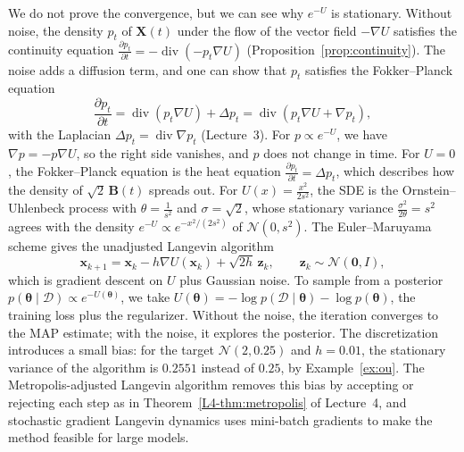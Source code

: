 \documentclass[11pt]{article}
\theoremstyle{definition}
\theoremstyle{plain}
\theoremstyle{remark}
\DeclareMathOperator{\Div}{div}
\begin{document}
We do not prove the convergence, but we can see why $e^{-U}$ is stationary. Without noise, the density $p_t$ of $\mathbf{X}(t)$ under the flow of the vector field $-\nabla U$ satisfies the continuity equation $\frac{\partial p_t}{\partial t} = -\Div(-p_t\nabla U)$ (Proposition~\ref{prop:continuity}). The noise adds a diffusion term, and one can show that $p_t$ satisfies the Fokker--Planck equation
\[\frac{\partial p_t}{\partial t} = \Div(p_t\nabla U) + \Delta p_t = \Div(p_t\nabla U + \nabla p_t),\]
with the Laplacian $\Delta p_t = \Div\nabla p_t$ (Lecture~3). For $p \propto e^{-U}$, we have $\nabla p = -p\nabla U$, so the right side vanishes, and $p$ does not change in time. For $U = 0$, the Fokker--Planck equation is the heat equation $\frac{\partial p_t}{\partial t} = \Delta p_t$, which describes how the density of $\sqrt{2}\,\mathbf{B}(t)$ spreads out. For $U(x) = \frac{x^2}{2s^2}$, the SDE is the Ornstein--Uhlenbeck process with $\theta = \frac{1}{s^2}$ and $\sigma = \sqrt{2}$, whose stationary variance $\frac{\sigma^2}{2\theta} = s^2$ agrees with the density $e^{-U} \propto e^{-x^2/(2s^2)}$ of $\mathcal{N}(0, s^2)$. The Euler--Maruyama scheme gives the unadjusted Langevin algorithm
\[\mathbf{x}_{k+1} = \mathbf{x}_k - h\nabla U(\mathbf{x}_k) + \sqrt{2h}\,\mathbf{z}_k, \qquad \mathbf{z}_k \sim \mathcal{N}(\mathbf{0}, I),\]
which is gradient descent on $U$ plus Gaussian noise. To sample from a posterior $p(\boldsymbol{\theta} \mid \mathcal{D}) \propto e^{-U(\boldsymbol{\theta})}$, we take $U(\boldsymbol{\theta}) = -\log p(\mathcal{D} \mid \boldsymbol{\theta}) - \log p(\boldsymbol{\theta})$, the training loss plus the regularizer. Without the noise, the iteration converges to the MAP estimate; with the noise, it explores the posterior. The discretization introduces a small bias: for the target $\mathcal{N}(2, 0.25)$ and $h = 0.01$, the stationary variance of the algorithm is $0.2551$ instead of $0.25$, by Example~\ref{ex:ou}. The Metropolis-adjusted Langevin algorithm removes this bias by accepting or rejecting each step as in Theorem~\ref{L4-thm:metropolis} of Lecture~4, and stochastic gradient Langevin dynamics uses mini-batch gradients to make the method feasible for large models.
\end{document}

